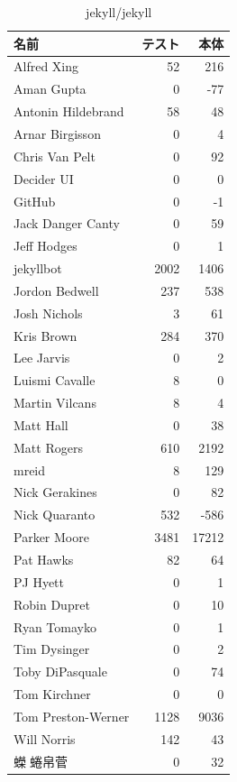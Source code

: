 \begin{table}[htb]
\begin{center}
\caption{jekyll/jekyll}
\begin{tabular}{|l|r|r|} \hline 
名前 & テスト & 本体 \\ \hline \hline
Alfred Xing & 52 & 216\\ \hline
Aman Gupta & 0 & -77\\ \hline
Antonin Hildebrand & 58 & 48\\ \hline
Arnar Birgisson & 0 & 4\\ \hline
Chris Van Pelt & 0 & 92\\ \hline
Decider UI & 0 & 0\\ \hline
GitHub & 0 & -1\\ \hline
Jack Danger Canty & 0 & 59\\ \hline
Jeff Hodges & 0 & 1\\ \hline
jekyllbot & 2002 & 1406\\ \hline
Jordon Bedwell & 237 & 538\\ \hline
Josh Nichols & 3 & 61\\ \hline
Kris Brown & 284 & 370\\ \hline
Lee Jarvis & 0 & 2\\ \hline
Luismi Cavalle & 8 & 0\\ \hline
Martin Vilcans & 8 & 4\\ \hline
Matt Hall & 0 & 38\\ \hline
Matt Rogers & 610 & 2192\\ \hline
mreid & 8 & 129\\ \hline
Nick Gerakines & 0 & 82\\ \hline
Nick Quaranto & 532 & -586\\ \hline
Parker Moore & 3481 & 17212\\ \hline
Pat Hawks & 82 & 64\\ \hline
PJ Hyett & 0 & 1\\ \hline
Robin Dupret & 0 & 10\\ \hline
Ryan Tomayko & 0 & 1\\ \hline
Tim Dysinger & 0 & 2\\ \hline
Toby DiPasquale & 0 & 74\\ \hline
Tom Kirchner & 0 & 0\\ \hline
Tom Preston-Werner & 1128 & 9036\\ \hline
Will Norris & 142 & 43\\ \hline
蠑蜷帛菅 & 0 & 32\\ \hline
\end{tabular}
\end{center}
\end{table}

